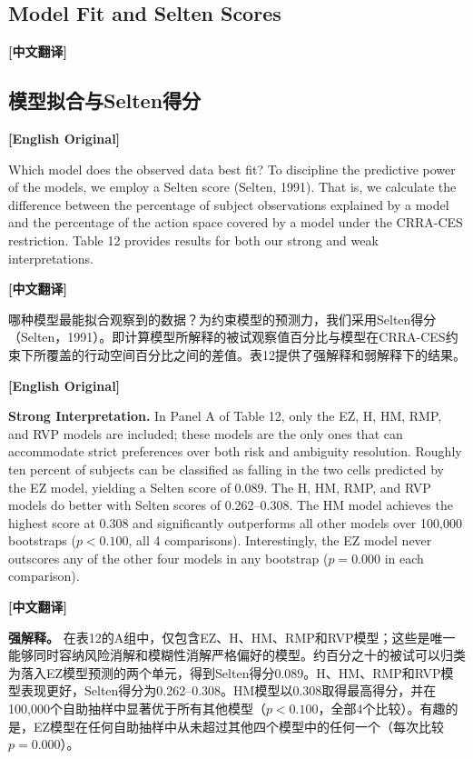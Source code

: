 \documentclass[12pt,a4paper]{ctexart}
\newenvironment{original}{%
  \par\medskip\noindent\textbf{[English Original]}\par\smallskip
  \color{black}\small
}{%
  \par\medskip
}
\newenvironment{translation}{%
  \par\noindent\textbf{[中文翻译]}\par\smallskip
  \color{blue}\small
}{%
  \par\bigskip
}
\theoremstyle{definition}
\theoremstyle{remark}
\begin{document}
\subsection{Model Fit and Selten Scores}
\begin{translation}
\subsection*{模型拟合与Selten得分}
\end{translation}

\begin{original}
Which model does the observed data best fit? To discipline the predictive power of the models, we employ a Selten score (Selten, 1991). That is, we calculate the difference between the percentage of subject observations explained by a model and the percentage of the action space covered by a model under the CRRA-CES restriction. Table 12 provides results for both our strong and weak interpretations.
\end{original}
\begin{translation}
哪种模型最能拟合观察到的数据？为约束模型的预测力，我们采用Selten得分（Selten，1991）。即计算模型所解释的被试观察值百分比与模型在CRRA-CES约束下所覆盖的行动空间百分比之间的差值。表12提供了强解释和弱解释下的结果。
\end{translation}

\begin{original}
\textbf{Strong Interpretation.} In Panel A of Table 12, only the EZ, H, HM, RMP, and RVP models are included; these models are the only ones that can accommodate strict preferences over both risk and ambiguity resolution. Roughly ten percent of subjects can be classified as falling in the two cells predicted by the EZ model, yielding a Selten score of 0.089. The H, HM, RMP, and RVP models do better with Selten scores of 0.262--0.308. The HM model achieves the highest score at 0.308 and significantly outperforms all other models over 100,000 bootstraps ($p < 0.100$, all 4 comparisons). Interestingly, the EZ model never outscores any of the other four models in any bootstrap ($p = 0.000$ in each comparison).
\end{original}
\begin{translation}
\textbf{强解释。} 在表12的A组中，仅包含EZ、H、HM、RMP和RVP模型；这些是唯一能够同时容纳风险消解和模糊性消解严格偏好的模型。约百分之十的被试可以归类为落入EZ模型预测的两个单元，得到Selten得分0.089。H、HM、RMP和RVP模型表现更好，Selten得分为0.262--0.308。HM模型以0.308取得最高得分，并在100,000个自助抽样中显著优于所有其他模型（$p < 0.100$，全部4个比较）。有趣的是，EZ模型在任何自助抽样中从未超过其他四个模型中的任何一个（每次比较$p = 0.000$）。
\end{translation}
\end{document}
